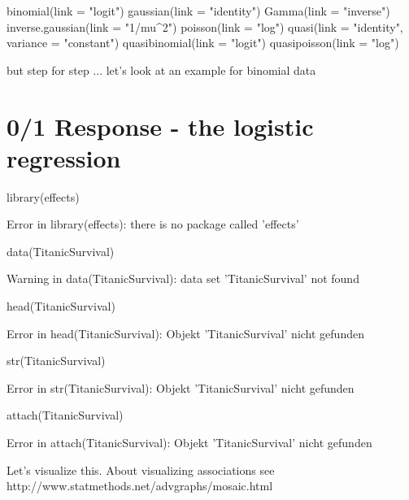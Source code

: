 \documentclass[a4paper,twoside]{tufte-book}\usepackage[]{graphicx}\usepackage[]{color}
\begin{document}
{\begin{appendices}
\begin{Schunk}
\begin{Sinput}
binomial(link = "logit")
gaussian(link = "identity")
Gamma(link = "inverse")
inverse.gaussian(link = "1/mu^2")
poisson(link = "log")
quasi(link = "identity", variance = "constant")
quasibinomial(link = "logit")
quasipoisson(link = "log")
\end{Sinput}
\end{Schunk}

but step for step ... let's look at an example for binomial data


\section{0/1 Response - the logistic regression}

\begin{Schunk}
\begin{Sinput}
library(effects) 
\end{Sinput}
\begin{Soutput}
Error in library(effects): there is no package called 'effects'
\end{Soutput}
\begin{Sinput}
data(TitanicSurvival)
\end{Sinput}
\begin{Soutput}
Warning in data(TitanicSurvival): data set 'TitanicSurvival' not found
\end{Soutput}
\begin{Sinput}
head(TitanicSurvival)
\end{Sinput}
\begin{Soutput}
Error in head(TitanicSurvival): Objekt 'TitanicSurvival' nicht gefunden
\end{Soutput}
\begin{Sinput}
str(TitanicSurvival)
\end{Sinput}
\begin{Soutput}
Error in str(TitanicSurvival): Objekt 'TitanicSurvival' nicht gefunden
\end{Soutput}
\begin{Sinput}
attach(TitanicSurvival)
\end{Sinput}
\begin{Soutput}
Error in attach(TitanicSurvival): Objekt 'TitanicSurvival' nicht gefunden
\end{Soutput}
\end{Schunk}

Let's visualize this. About visualizing associations see http://www.statmethods.net/advgraphs/mosaic.html


\end{appendices}}
\end{document}

